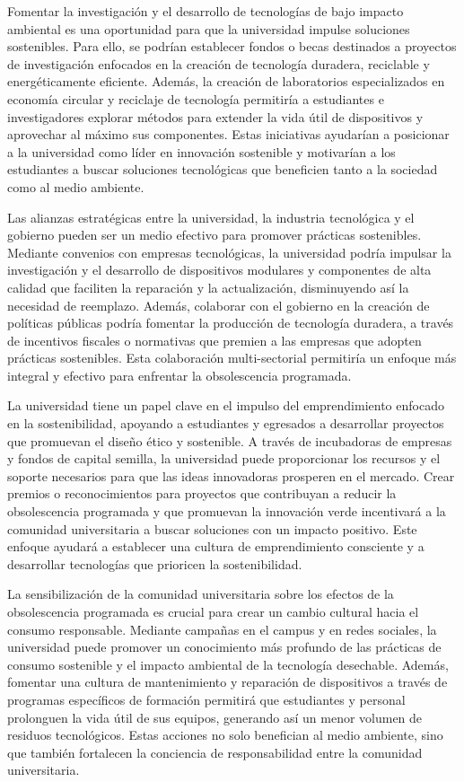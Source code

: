 \documentclass[10pt,journal,compsoc]{IEEEtran}
\begin{document}
Fomentar la investigación y el desarrollo de tecnologías de bajo impacto ambiental es una oportunidad para que la universidad impulse soluciones sostenibles. Para ello, se podrían establecer fondos o becas destinados a proyectos de investigación enfocados en la creación de tecnología duradera, reciclable y energéticamente eficiente. Además, la creación de laboratorios especializados en economía circular y reciclaje de tecnología permitiría a estudiantes e investigadores explorar métodos para extender la vida útil de dispositivos y aprovechar al máximo sus componentes. Estas iniciativas ayudarían a posicionar a la universidad como líder en innovación sostenible y motivarían a los estudiantes a buscar soluciones tecnológicas que beneficien tanto a la sociedad como al medio ambiente.

Las alianzas estratégicas entre la universidad, la industria tecnológica y el gobierno pueden ser un medio efectivo para promover prácticas sostenibles. Mediante convenios con empresas tecnológicas, la universidad podría impulsar la investigación y el desarrollo de dispositivos modulares y componentes de alta calidad que faciliten la reparación y la actualización, disminuyendo así la necesidad de reemplazo. Además, colaborar con el gobierno en la creación de políticas públicas podría fomentar la producción de tecnología duradera, a través de incentivos fiscales o normativas que premien a las empresas que adopten prácticas sostenibles. Esta colaboración multi-sectorial permitiría un enfoque más integral y efectivo para enfrentar la obsolescencia programada.

La universidad tiene un papel clave en el impulso del emprendimiento enfocado en la sostenibilidad, apoyando a estudiantes y egresados a desarrollar proyectos que promuevan el diseño ético y sostenible. A través de incubadoras de empresas y fondos de capital semilla, la universidad puede proporcionar los recursos y el soporte necesarios para que las ideas innovadoras prosperen en el mercado. Crear premios o reconocimientos para proyectos que contribuyan a reducir la obsolescencia programada y que promuevan la innovación verde incentivará a la comunidad universitaria a buscar soluciones con un impacto positivo. Este enfoque ayudará a establecer una cultura de emprendimiento consciente y a desarrollar tecnologías que prioricen la sostenibilidad.

La sensibilización de la comunidad universitaria sobre los efectos de la obsolescencia programada es crucial para crear un cambio cultural hacia el consumo responsable. Mediante campañas en el campus y en redes sociales, la universidad puede promover un conocimiento más profundo de las prácticas de consumo sostenible y el impacto ambiental de la tecnología desechable. Además, fomentar una cultura de mantenimiento y reparación de dispositivos a través de programas específicos de formación permitirá que estudiantes y personal prolonguen la vida útil de sus equipos, generando así un menor volumen de residuos tecnológicos. Estas acciones no solo benefician al medio ambiente, sino que también fortalecen la conciencia de responsabilidad entre la comunidad universitaria.
\end{document}
